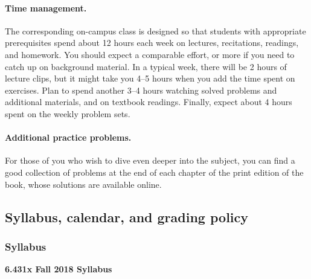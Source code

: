 \documentclass[pdftex, brazil, 12pt, twoside]{article}
\begin{document}
\paragraph{Time management.} The corresponding on-campus class is designed so that
students with appropriate prerequisites spend about 12 hours each week on lectures,
recitations, readings, and homework. You should expect a comparable effort, or more
if you need to catch up on background material. In a typical week, there will be 2
hours of lecture clips, but it might take you 4--5 hours when you add the time spent
on exercises. Plan to spend another 3--4 hours watching solved problems and additional
materials, and on textbook readings. Finally, expect about 4 hours spent on the
weekly problem sets.

\paragraph{Additional practice problems.} For those of you who wish to dive even
deeper into the subject, you can find a good collection of problems at the end of
each chapter of the print edition of the book, whose solutions are available online. 


\subsection{Syllabus, calendar, and grading policy}
\label{ovw0-sy}

\subsubsection{Syllabus}
\label{ovw0-sy-sy}

\textbf{6.431x Fall 2018 Syllabus}
\end{document}
